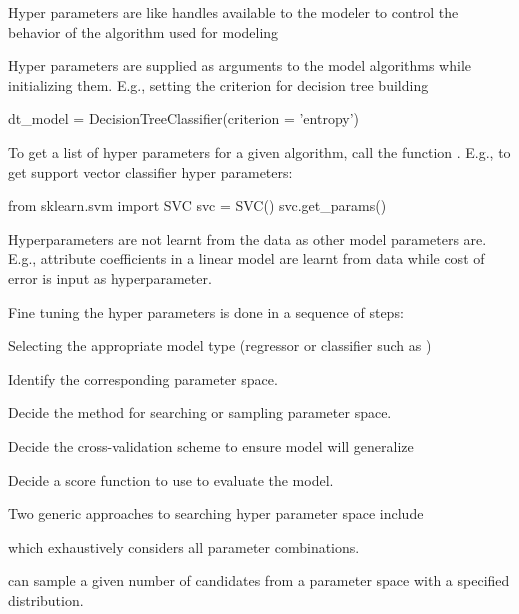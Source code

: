 	\begin{numberedlist}
		\item Hyper parameters are like handles available to the modeler to control the behavior of the algorithm used for modeling
		\item Hyper parameters are supplied as arguments to the model algorithms while initializing them.  E.g., setting the criterion for decision tree building
		\begin{code}[\codenumbering]{}
			\codeitemnonumber dt\_model = DecisionTreeClassifier(criterion = 'entropy')
		\end{code}
		\item To get a list of hyper parameters for a given algorithm, call the function \newline{}.  E.g., to get support vector classifier hyper parameters:
		\begin{code}[\codenumbering]{}
			\codeitemnonumber from sklearn.svm import SVC
			\codeitemnonumber svc = SVC()
			\codeitemnonumber svc.get\_params()
		\end{code}
		\item Hyperparameters are not learnt from the data as other model parameters are.  E.g., attribute coefficients in a linear model are learnt from data while cost of error is input as hyperparameter.
		\item Fine tuning the hyper parameters is done in a sequence of steps:
		\begin{numberedlist}
			\item Selecting the appropriate model type (regressor or classifier such as \newline{})
			\item Identify the corresponding parameter space.
			\item Decide the method for searching or sampling parameter space.
			\item Decide the cross-validation scheme to ensure model will generalize
			\item Decide a score function to use to evaluate the model.
		\end{numberedlist}
		\item Two generic approaches to searching hyper parameter space include
		\begin{numberedlist}
			\item {} which exhaustively considers all parameter combinations.
			\item {} can sample a given number of candidates from a parameter space with a specified distribution.

\end{numberedlist}
\end{numberedlist}
